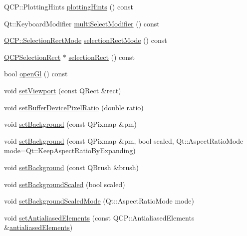 \begin{DoxyCompactItemize}
\item 
Q\+C\+P\+::\+Plotting\+Hints \mbox{\hyperlink{class_q_custom_plot_ac724f4075822f74f7b676a790095b877}{plotting\+Hints}} () const
\item 
Qt\+::\+Keyboard\+Modifier \mbox{\hyperlink{class_q_custom_plot_a28182402ed11609c9a429f0788162d18}{multi\+Select\+Modifier}} () const
\item 
\mbox{\hyperlink{namespace_q_c_p_ac9aa4d6d81ac76b094f9af9ad2d3aacf}{Q\+C\+P\+::\+Selection\+Rect\+Mode}} \mbox{\hyperlink{class_q_custom_plot_a6e53c402de2770a978dffa5584c05b27}{selection\+Rect\+Mode}} () const
\item 
\mbox{\hyperlink{class_q_c_p_selection_rect}{Q\+C\+P\+Selection\+Rect}} $\ast$ \mbox{\hyperlink{class_q_custom_plot_ad7df2bcbba307e644db383b449e31efd}{selection\+Rect}} () const
\item 
bool \mbox{\hyperlink{class_q_custom_plot_abe5556ac80dc0140fd57f2b2f94a1f0e}{open\+Gl}} () const
\item 
void \mbox{\hyperlink{class_q_custom_plot_a3f9bc4b939dd8aaba9339fd09f273fc4}{set\+Viewport}} (const Q\+Rect \&rect)
\item 
void \mbox{\hyperlink{class_q_custom_plot_a159162653ad6f8b8bf21263ba5787215}{set\+Buffer\+Device\+Pixel\+Ratio}} (double ratio)
\item 
void \mbox{\hyperlink{class_q_custom_plot_a130358592cfca353ff3cf5571b49fb00}{set\+Background}} (const Q\+Pixmap \&pm)
\item 
void \mbox{\hyperlink{class_q_custom_plot_a8513971d6aa24d8b0d6a68d45b542130}{set\+Background}} (const Q\+Pixmap \&pm, bool scaled, Qt\+::\+Aspect\+Ratio\+Mode mode=Qt\+::\+Keep\+Aspect\+Ratio\+By\+Expanding)
\item 
void \mbox{\hyperlink{class_q_custom_plot_a8ed256cf467bfa7ba1f9feaae62c3bd0}{set\+Background}} (const Q\+Brush \&brush)
\item 
void \mbox{\hyperlink{class_q_custom_plot_a36f0fa1317325dc7b7efea615ee2de1f}{set\+Background\+Scaled}} (bool scaled)
\item 
void \mbox{\hyperlink{class_q_custom_plot_a4c0eb4865b7949f62e1cb97db04a3de0}{set\+Background\+Scaled\+Mode}} (Qt\+::\+Aspect\+Ratio\+Mode mode)
\item 
void \mbox{\hyperlink{class_q_custom_plot_af6f91e5eab1be85f67c556e98c3745e8}{set\+Antialiased\+Elements}} (const Q\+C\+P\+::\+Antialiased\+Elements \&\mbox{\hyperlink{class_q_custom_plot_a631762eb183aceecee73d30e108641ee}{antialiased\+Elements}})
\item 

\end{DoxyCompactItemize}

